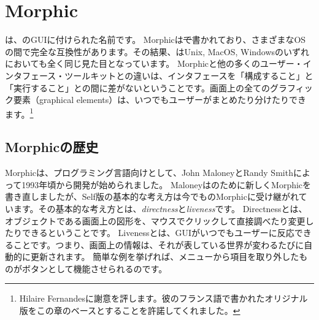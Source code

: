 \documentclass[a4paper,10pt,twoside]{book}
\begin{document}
	\sloppy
\fi
\chapter{Morphic}


は、\pharo のGUIに付けられた名前です。
Morphicは\st で書かれており、さまざまなOSの間で完全な互換性があります。その結果、\pharo はUnix, MacOS, Windowsのいずれにおいても全く同じ見た目となっています。
Morphicと他の多くのユーザー・インタフェース・ツールキットとの違いは、インタフェースを「構成すること」と「実行すること」との間に差がないということです。画面上の全てのグラフィック要素（graphical elements）は、いつでもユーザーがまとめたり分けたりできます。\footnote{Hilaire Fernandesに謝意を評します。彼のフランス語で書かれたオリジナル版をこの章のベースとすることを許諾してくれました。}



\section{Morphicの歴史}

Morphicは、プログラミング言語向けとして、John MaloneyとRandy Smithによって1993年頃から開発が始められました。
Maloneyは\squeak のために新しくMorphicを書き直しましたが、Self版の基本的な考え方は今でも\pharo のMorphicに受け継がれています。その基本的な考え方とは、\emph{directness}と\emph{liveness}です。
Directnessとは、オブジェクトである画面上の図形を、マウスでクリックして直接調べたり変更したりできるということです。
Livenessとは、GUIがいつでもユーザーに反応できることです。つまり、画面上の情報は、それが表している世界が変わるたびに自動的に更新されます。
簡単な例を挙げれば、メニューから項目を取り外したものがボタンとして機能させられるのです。
\end{document}
